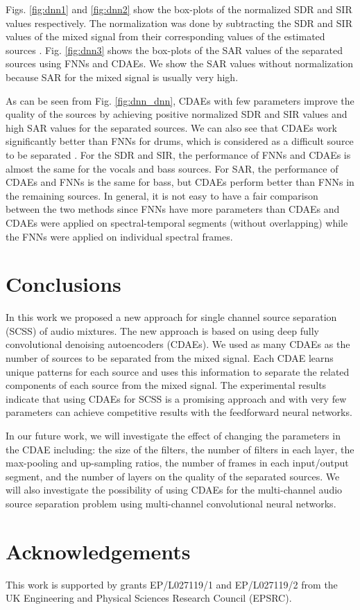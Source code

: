 \documentclass{article}
\begin{document}
Figs. \ref{fig:dnn1} and \ref{fig:dnn2} show the box-plots of the normalized SDR and SIR values respectively. The normalization was done by subtracting the SDR and SIR values of the mixed signal from their corresponding values of the estimated sources \cite{alexey:07:aobmfscssaiatvmsips}. Fig. \ref{fig:dnn3} shows the box-plots of the SAR values of the separated sources using FNNs and CDAEs. We show the SAR values without normalization because SAR for the mixed signal is usually very high. 

As can be seen from Fig. \ref{fig:dnn_dnn}, CDAEs with few parameters improve the quality of the sources by achieving positive normalized SDR and SIR values and high SAR values for the separated sources. We can also see that CDAEs work significantly better than FNNs for drums, which is considered as a difficult source to be separated \cite{Stefan:17:imssbdnntdanb,arie:16:masswdnn}. For the SDR and SIR, the performance of FNNs and CDAEs is almost the same for the vocals and bass sources. For SAR, the performance of CDAEs and FNNs is the same for bass, but CDAEs perform better than FNNs in the remaining sources. In general, it is not easy to have a fair comparison between the two methods since FNNs have more parameters than CDAEs and CDAEs were applied on spectral-temporal segments (without overlapping) while the FNNs were applied on individual spectral frames. %

\section{Conclusions}
In this work we proposed a new approach for single channel source separation (SCSS) of audio mixtures. The new approach is based on using deep fully convolutional denoising autoencoders (CDAEs). We used as many CDAEs as the number of sources to be separated from the mixed signal. Each CDAE learns unique patterns for each source and uses this information to separate the related components of each source from the mixed signal. The experimental results indicate that using CDAEs for SCSS is a promising approach and with very few parameters can achieve competitive results with the feedforward neural networks. 

In our future work, we will investigate the effect of changing the parameters in the CDAE including: the size of the filters, the number of filters in each layer, the max-pooling and up-sampling ratios, the number of frames in each input/output segment, and the number of layers on the quality of the separated sources. We will also investigate the possibility of using CDAEs for the multi-channel audio source separation problem using multi-channel convolutional neural networks.     

\section{Acknowledgements}
 This work is supported by grants EP/L027119/1 and EP/L027119/2 from the UK Engineering and Physical Sciences Research Council (EPSRC).
% 
%


\end{document}
